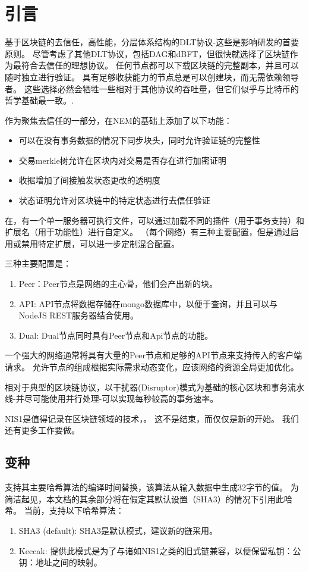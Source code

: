 \section{引言}
\label{sec:introduction}


基于区块链的去信任，高性能，分层体系结构的DLT协议-这些是影响\codename 研发的首要原则。
尽管考虑了其他DLT协议，包括DAG和dBFT，但很快就选择了区块链作为最符合去信任的理想协议。
任何节点都可以下载区块链的完整副本，并且可以随时独立进行验证。
具有足够收获能力的节点总是可以创建块，而无需依赖领导者。
这些选择必然会牺牲一些相对于其他协议的吞吐量，但它们似乎与比特币的哲学基础最一致。\cite{nakamoto2009}.

作为聚焦去信任的一部分，在NEM的基础上添加了以下功能：
\begin{itemize}
    \item{可以在没有事务数据的情况下同步块头，同时允许验证链的完整性}
    \item{交易merkle树允许在区块内对交易是否存在进行加密证明}
    \item{收据增加了间接触发状态更改的透明度}
    \item{状态证明允许对区块链中的特定状态进行去信任验证}
\end{itemize}


在，有一个单一服务器可执行文件，可以通过加载不同的插件（用于事务支持）和扩展名（用于功能性）进行自定义。
（每个网络）有三种主要配置，但是通过启用或禁用特定扩展，可以进一步定制混合配置。

三种主要配置是：
\begin{enumerate}
\item Peer：Peer节点是网络的主心骨，他们会产出新的块。
\item API: API节点将数据存储在mongo数据库中，以便于查询，并且可以与NodeJS REST服务器结合使用。
\item Dual: Dual节点同时具有Peer节点和Api节点的功能。
\end{enumerate}


一个强大的网络通常将具有大量的Peer节点和足够的API节点来支持传入的客户端请求。
允许节点的组成根据实际需求动态变化，应该网络的资源全局更加优化。

相对于典型的区块链协议，以干扰器(Disruptor)模式为基础的核心区块和事务流水线-并尽可能使用并行处理-可以实现每秒较高的事务速率。


NIS1是值得记录在区块链领域的技术，。
这不是结束，而仅仅是新的开始。
我们还有更多工作要做。

\subsection{变种}

\codenamespace 支持其主要哈希算法的编译时间替换，该算法从输入数据中生成32字节的值。
为简洁起见，本文档的其余部分将在假定其默认设置（SHA3）的情况下引用此哈希。
当前，支持以下哈希算法：

\begin{enumerate}
    \item{SHA3 (default): SHA3是默认模式，建议新的链采用。}
    \item{Keccak: 提供此模式是为了与诸如NIS1之类的旧式链兼容，以便保留私钥：公钥：地址之间的映射。}
\end{enumerate}
